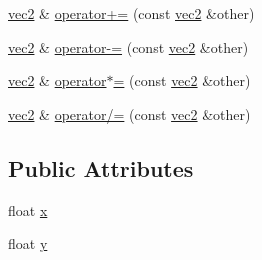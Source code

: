 \begin{DoxyCompactItemize}
\item 
\hyperlink{structu__engine_1_1maths_1_1vec2}{vec2} \& \hyperlink{structu__engine_1_1maths_1_1vec2_ae391a123d5c6a0481d9add1ed18344a2}{operator+=} (const \hyperlink{structu__engine_1_1maths_1_1vec2}{vec2} \&other)
\item 
\hyperlink{structu__engine_1_1maths_1_1vec2}{vec2} \& \hyperlink{structu__engine_1_1maths_1_1vec2_a551721c28c7516406cb7a7dc89399505}{operator-\/=} (const \hyperlink{structu__engine_1_1maths_1_1vec2}{vec2} \&other)
\item 
\hyperlink{structu__engine_1_1maths_1_1vec2}{vec2} \& \hyperlink{structu__engine_1_1maths_1_1vec2_a7022f354e0dfb9ea0fff3549ef0497c0}{operator$\ast$=} (const \hyperlink{structu__engine_1_1maths_1_1vec2}{vec2} \&other)
\item 
\hyperlink{structu__engine_1_1maths_1_1vec2}{vec2} \& \hyperlink{structu__engine_1_1maths_1_1vec2_a92ee54dab1a7d9036665c87a2a1eb28b}{operator/=} (const \hyperlink{structu__engine_1_1maths_1_1vec2}{vec2} \&other)
\end{DoxyCompactItemize}
\subsection*{Public Attributes}
\begin{DoxyCompactItemize}
\item 
float \hyperlink{structu__engine_1_1maths_1_1vec2_a25400d4a0d4e8bf5a24fd3a3e2073d4a}{x}
\item 
float \hyperlink{structu__engine_1_1maths_1_1vec2_acf03e4690998267ec3c7b6e957746355}{y}
\end{DoxyCompactItemize}
